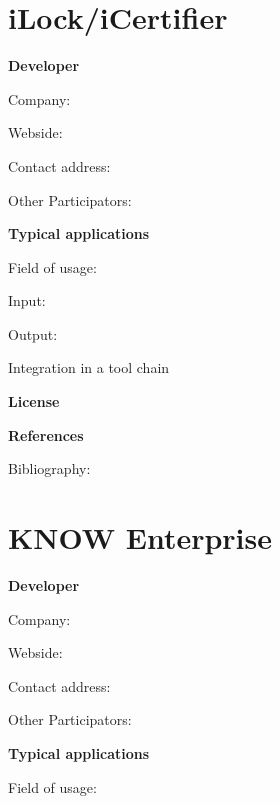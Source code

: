 \documentclass{./template/openetcs_report}
\begin{document}
\section{iLock/iCertifier}

	\textbf{Developer}

	Company: 

	Webside:

	Contact address:

	Other  Participators:



	\textbf{Typical applications}

	Field of usage:


	Input:

	Output:





	Integration in a tool chain



	\textbf{License}


	\textbf{References}

	Bibliography:


\section{KNOW Enterprise}

	\textbf{Developer}

	Company: 

	Webside:

	Contact address:

	Other  Participators:



	\textbf{Typical applications}

	Field of usage:

\end{document}
